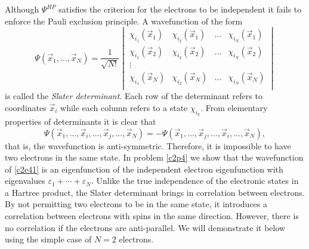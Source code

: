 Although $\Psi^{HP}$ satisfies the criterion for the electrons to be independent
it fails to enforce the Pauli exclusion principle. A wavefunction of the
form
\begin{equation}\label{c2e41}
\Psi(\vec{x}_1, \ldots, \vec{x}_N) = \frac{1}{\sqrt{N!}}\begin{vmatrix}
\chi_{i_1}(\vec{x}_1) & \chi_{i_2}(\vec{x}_1) & \ldots & \chi_{i_N}(\vec{x}_1) \\
\chi_{i_1}(\vec{x}_2) & \chi_{i_2}(\vec{x}_2) & \ldots & \chi_{i_N}(\vec{x}_2) \\
\vdots \\
\chi_{i_1}(\vec{x}_N) & \chi_{i_2}(\vec{x}_N) & \ldots & \chi_{i_N}(\vec{x}_N) \\
\end{vmatrix}
\end{equation}
is called the \emph{Slater determinant}. Each row of the determinant refers
to coordinates $\vec{x}_i$ while each column refers to a state $\chi_{i_k}$.
From elementary properties of determinants it is clear that
\begin{equation}\label{c2e42}
\Psi(\vec{x}_1, \ldots, \vec{x}_i, \ldots, \vec{x}_j, \ldots, \vec{x}_N) = 
-\Psi(\vec{x}_1, \ldots, \vec{x}_j, \ldots, \vec{x}_i, \ldots, \vec{x}_N),
\end{equation}
that is, the wavefunction is anti-symmetric. Therefore, it is impossible to
have two electrons in the same state. In problem \ref{c2p4} we show that the
wavefunction of \eqref{c2e41} is an eigenfunction of the independent electron
eigenfunction with eigenvalues $\varepsilon_1 + \cdots + \varepsilon_N$. Unlike
the true independence of the electronic states in a Hartree product, the Slater
determinant brings in correlation between electrons. By not permitting two 
electrons to be in the same state, it introduces a correlation between electrons
with spins in the same direction. However, there is no correlation if the 
electrons are anti-parallel. We will demonstrate it below using the simple case
of $N = 2$ electrons.

